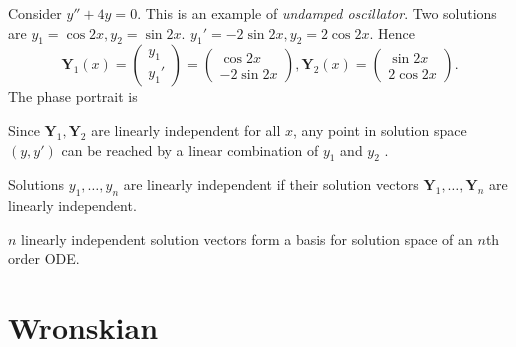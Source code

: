 \documentclass[10pt]{article}
\begin{document}
    \begin{example}
        Consider $ y''+4y=0 $. This is an example of \textit{undamped oscillator}. Two solutions are $ y_1=\cos 2x, y_2=\sin 2x $. $ y_1'=-2 \sin 2x, y_2= 2 \cos 2x $. Hence 
        \[
            \mathbf{Y}_1(x)=\begin{pmatrix}
                y_1\\y_1'
            \end{pmatrix}=\begin{pmatrix}
                \cos 2x\\-2 \sin 2x
            \end{pmatrix}, \mathbf{Y}_2(x)=\begin{pmatrix}
                \sin 2x\\2 \cos 2x
            \end{pmatrix}
        .\]
        The phase portrait is 
        \begin{center}
          \end{center}
          Since $\mathbf{Y}_1,\mathbf{Y}_2$ are linearly independent for all $x$, any point in solution space $(y,y')$ can be reached by a linear combination of $y_1$ and $y_2$ .
    \end{example}

    Solutions $y_1,\dots,y_n$ are linearly independent if their solution vectors $ \mathbf{Y}_1,\dots,\mathbf{Y}_n $ are linearly independent.

    $n$ linearly independent solution vectors form a basis for solution space of an $n$th order ODE.
    \section{Wronskian}
\end{document}
